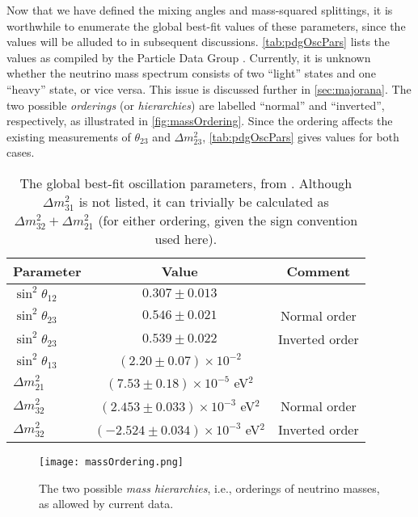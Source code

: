 \documentclass[../thesis.tex]{subfiles}
\begin{document}
Now that we have defined the mixing angles and mass-squared splittings, it is worthwhile to enumerate the global best-fit values of these parameters, since the values will be alluded to in subsequent discussions. \autoref{tab:pdgOscPars} lists the values as compiled by the Particle Data Group \cite{PDG}. Currently, it is unknown whether the neutrino mass spectrum consists of two ``light'' states and one ``heavy'' state, or vice versa. This issue is discussed further in \autoref{sec:majorana}. The two possible \emph{orderings} (or \emph{hierarchies}) are labelled ``normal'' and ``inverted'', respectively, as illustrated in \autoref{fig:massOrdering}. Since the ordering affects the existing measurements of $\theta_{23}$ and $\Delta m^2_{23}$, \autoref{tab:pdgOscPars} gives values for both cases.

\begin{table}[h]
  \begin{tabular}{lcc}
    \toprule
    Parameter & Value & Comment \\
    \midrule
    $\sin^2 \theta_{12}$ & $0.307 \pm 0.013$ & \\
    $\sin^2 \theta_{23}$ & $0.546 \pm 0.021$ & Normal order \\
    $\sin^2 \theta_{23}$ & $0.539 \pm 0.022$ & Inverted order \\
    $\sin^2 \theta_{13}$ & $(2.20 \pm 0.07) \times 10^{-2}$ & \\
    \midrule
    $\Delta m^2_{21}$ & $(7.53 \pm 0.18) \times 10^{-5}$ eV$^2$ & \\
    $\Delta m^2_{32}$ & $(2.453 \pm 0.033) \times 10^{-3}$ eV$^2$ & Normal order \\
    $\Delta m^2_{32}$ & $(-2.524 \pm 0.034) \times 10^{-3}$ eV$^2$ & Inverted order \\
    \bottomrule
  \end{tabular}
  \caption{The global best-fit oscillation parameters, from \cite{PDG}. Although $\Delta m^2_{31}$ is not listed, it can trivially be calculated as $\Delta m^2_{32} + \Delta m^2_{21}$ (for either ordering, given the sign convention used here).}
  \label{tab:pdgOscPars}
\end{table}

\begin{figure}[h]
  \texttt{[image: massOrdering.png]}
  \caption{The two possible \emph{mass hierarchies}, i.e., orderings of neutrino masses, as allowed by current data.}
  \label{fig:massOrdering}
\end{figure}
\end{document}
